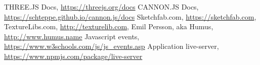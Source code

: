 \documentclass[a4paper, 11pt, titlepage]{report}
\begin{document}
\begin{thebibliography}{999}
		THREE.JS Docs,
		\url{https://threejs.org/docs}
		CANNON.JS Docs,
		\url{https://schteppe.github.io/cannon.js/docs}
		Sketchfab.com,
		\url{https://sketchfab.com},
		TextureLibs.com,
		\url{http://texturelib.com},
		Emil Persson, aka Humus,
		\url{http://www.humus.name}
		Javascript events,
		\url{https://www.w3schools.com/js/js_events.asp}
		Application live-server,
		\url{https://www.npmjs.com/package/live-server}
\end{thebibliography}
\end{document}
